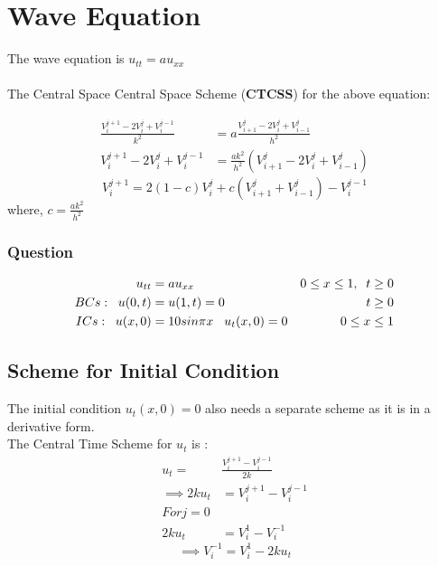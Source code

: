 \chapter{Wave Equation}

The wave equation is \hspace{5mm} \(u_{tt}=au_{xx}\) \\ \\

The Central Space Central Space Scheme (\textbf{CTCSS}) for the above equation:

\begin{align*}
  \frac{V_i^{j+1}-2V_i^j+V_i^{j-1}}{k^2} &=  a \frac{V_{i+1}^j-2V_i^j+V_{i-1}^j}{h^2}\\
  V_i^{j+1}-2V_i^j+V_i^{j-1} &= \frac{ak^2}{h^2}(V_{i+1}^j-2V_i^j+V_{i-1}^j)
 \end{align*}
\begin{equation}
  V_i^{j+1} = 2(1-c)V_i^j + c(V_{i+1}^j+V_{i-1}^j)  - V_i^{j-1}
\end{equation}
where, \hspace{5mm} \(c=\frac{ak^2}{h^2}\) \\

\subsection{Question}
\begin{align*}
    u_{tt} &= au_{xx}           &   0 \leq x \leq 1, \;\; t\geq 0\\
    BCs:\;\; u(0,t) &= u(1,t)=0   &   t \geq 0\\
    ICs:\;\; u(x,0)  &= 10sin{\pi}x \hspace{3mm} u_t(x,0)=0  &   0 \leq x \leq 1
\end{align*}

\clearpage

\section{Scheme for Initial Condition}
The initial condition \(u_t(x,0)=0\) also needs a separate scheme as it is in a derivative form.\\

The Central Time Scheme for \(u_t\) is :
\begin{align*}
  u_t =& \frac{V_i^{j+1} - V_i^{j-1}}{2k}\\
  \implies 2ku_t &= V_i^{j+1} - V_i^{j-1}\\
  For j=0 \\
  2ku_t &= V_i^1 - V_i^{-1}
\end{align*}
\begin{equation}
 \implies V_i^{-1} = V_i^1 - 2ku_t
\end{equation}
\\

